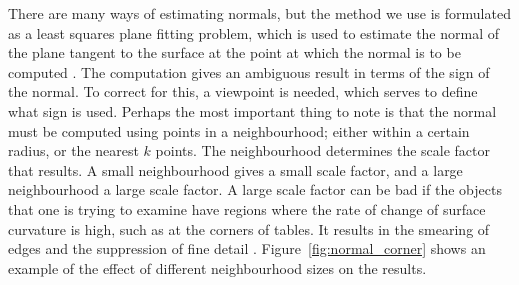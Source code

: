 \documentclass[11pt,a4paper]{kth-mag}
\begin{document}
There are many ways of estimating normals, but the method we use is formulated
as a least squares plane fitting problem, which is used to estimate the normal
of the plane tangent to the surface at the point at which the normal is to be
computed \cite{RusuDoctoralDissertation}. The computation gives an ambiguous
result in terms of the sign of the normal. To correct for this, a viewpoint is
needed, which serves to define what sign is used. Perhaps the most important
thing to note is that the normal must be computed using points in a
neighbourhood; either within a certain radius, or the nearest $k$ points. The
neighbourhood determines the scale factor that results. A small neighbourhood
gives a small scale factor, and a large neighbourhood a large scale factor. A
large scale factor can be bad if the objects that one is trying to examine have
regions where the rate of change of surface curvature is high, such as at the
corners of tables. It results in the smearing of edges and the suppression of
fine detail \cite{RusuDoctoralDissertation}. Figure~\ref{fig:normal_corner}
shows an example of the effect of different neighbourhood sizes on the results.
\end{document}
